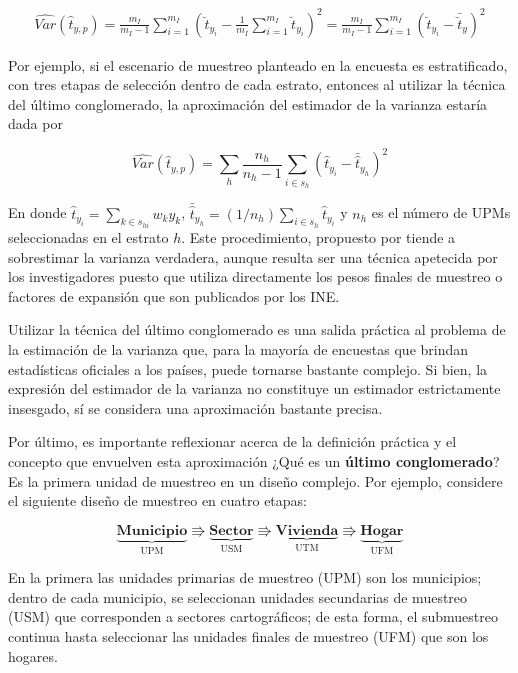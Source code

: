 \documentclass[
  12pt,
]{book}
\begin{document}
\begin{align}
\label{UC}
\widehat{Var}(\hat{t}_{y,p})
=\frac{m_I}{m_I-1}\sum_{i=1}^{m_I}\left( \breve{t}_{y_i} -\frac{1}{m_I}\sum_{i=1}^{m_I}\breve{t}_{y_i} \right)^2 
=\frac{m_I}{m_I-1}\sum_{i=1}^{m_I}\left( \breve{t}_{y_i} - \bar{\breve{t}}_{y} \right)^2
\end{align}

Por ejemplo, si el escenario de muestreo planteado en la encuesta es estratificado, con tres etapas de selección dentro de cada estrato, entonces al utilizar la técnica del último conglomerado, la aproximación del estimador de la varianza estaría dada por

\[
\widehat{Var}(\hat{t}_{y,p}) = 
\sum_h\frac{n_h}{n_h-1}\sum_{i\in s_h}\left(\hat{t}_{y_i}-\bar{\hat{t}}_{y_h}\right)^2
\]

En donde \(\hat{t}_{y_i} = \sum_{k \in s_{hi}} w_k y_k\), \(\bar{\hat{t}}_{y_h}=(1/n_h)\sum_{i \in s_h}\hat{t}_{y_i}\) y \(n_h\) es el número de UPMs seleccionadas en el estrato \(h\). Este procedimiento, propuesto por \citet{hansen1953sample} tiende a sobrestimar la varianza verdadera, aunque resulta ser una técnica apetecida por los investigadores puesto que utiliza directamente los pesos finales de muestreo o factores de expansión que son publicados por los INE.

Utilizar la técnica del último conglomerado es una salida práctica al problema de la estimación de la varianza que, para la mayoría de encuestas que brindan estadísticas oficiales a los países, puede tornarse bastante complejo. Si bien, la expresión del estimador de la varianza no constituye un estimador estrictamente insesgado, sí se considera una aproximación bastante precisa.

Por último, es importante reflexionar acerca de la definición práctica y el concepto que envuelven esta aproximación ¿Qué es un \textbf{último conglomerado}? Es la primera unidad de muestreo en un diseño complejo. Por ejemplo, considere el siguiente diseño de muestreo en cuatro etapas:

\begin{equation*}
\underbrace{\textbf{Municipio}}_{\text{UPM}} \Rrightarrow
\underbrace{\textbf{Sector}}_{\text{USM}} \Rrightarrow
\underbrace{\textbf{Vivienda}}_{\text{UTM}} \Rrightarrow
\underbrace{\textbf{Hogar}}_{\text{UFM}}
\end{equation*}

En la primera las unidades primarias de muestreo (UPM) son los municipios; dentro de cada municipio, se seleccionan unidades secundarias de muestreo (USM) que corresponden a sectores cartográficos; de esta forma, el submuestreo continua hasta seleccionar las unidades finales de muestreo (UFM) que son los hogares.
\end{document}
